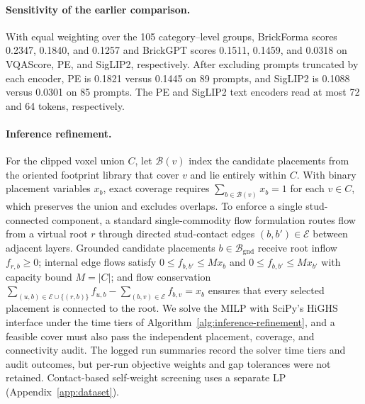 \paragraph{Sensitivity of the earlier comparison.}
With equal weighting over the 105 category--level groups, BrickForma scores 0.2347, 0.1840, and 0.1257 and BrickGPT scores 0.1511, 0.1459, and 0.0318 on VQAScore, PE, and SigLIP2, respectively. After excluding prompts truncated by each encoder, PE is 0.1821 versus 0.1445 on 89 prompts, and SigLIP2 is 0.1088 versus 0.0301 on 85 prompts. The PE and SigLIP2 text encoders read at most 72 and 64 tokens, respectively.

\paragraph{Inference refinement.}
For the clipped voxel union $C$, let $\mathcal{B}(v)$ index the candidate placements from the oriented footprint library that cover $v$ and lie entirely within $C$. With binary placement variables $x_b$, exact coverage requires $\sum_{b\in\mathcal{B}(v)}x_b=1$ for each $v\in C$, which preserves the union and excludes overlaps. To enforce a single stud-connected component, a standard single-commodity flow formulation routes flow from a virtual root $r$ through directed stud-contact edges $(b,b')\in\mathcal{E}$ between adjacent layers. Grounded candidate placements $b\in\mathcal{B}_{\mathrm{gnd}}$ receive root inflow $f_{r,b}\ge 0$; internal edge flows satisfy $0\le f_{b,b'}\le M x_b$ and $0\le f_{b,b'}\le M x_{b'}$ with capacity bound $M=|C|$; and flow conservation $\sum_{(u,b)\in\mathcal{E}\cup\{(r,b)\}} f_{u,b} - \sum_{(b,v)\in\mathcal{E}} f_{b,v} = x_b$ ensures that every selected placement is connected to the root. We solve the MILP with SciPy's HiGHS interface under the time tiers of Algorithm~\ref{alg:inference-refinement}, and a feasible cover must also pass the independent placement, coverage, and connectivity audit. The logged run summaries record the solver time tiers and audit outcomes, but per-run objective weights and gap tolerances were not retained. Contact-based self-weight screening uses a separate LP (Appendix~\ref{app:dataset}).


